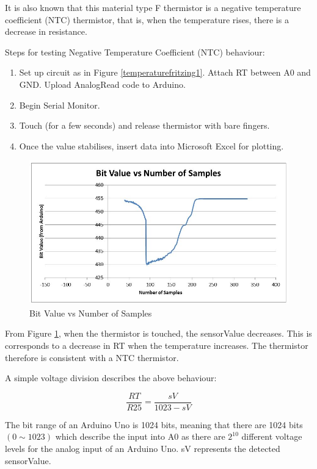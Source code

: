 It is also known that this material type F thermistor is a negative temperature coefficient (NTC) thermistor, that is, when the temperature rises, there is a decrease in resistance. 

Steps for testing Negative Temperature Coefficient (NTC) behaviour: 
\begin{enumerate}
	\item Set up circuit as in Figure \ref{temperaturefritzing1}. Attach RT between A0 and GND. Upload AnalogRead code to Arduino. 
	\item Begin Serial Monitor.
	\item Touch (for a few seconds) and release thermistor with bare fingers. 
	\item Once the value stabilises, insert data into Microsoft Excel for plotting. 
\end{enumerate}

\begin{figure}[H]
	\centering
	\includegraphics[width=\linewidth]{thermistor1.jpg}
	\caption{Bit Value vs Number of Samples}
	\label{bitvaluevssamples}
\end{figure}

From Figure \ref{bitvaluevssamples}, when the thermistor is touched, the sensorValue decreases. This is corresponds to a decrease in RT when the temperature increases. The thermistor therefore is consistent with a NTC thermistor. 

A simple voltage division describes the above behaviour: 

\begin{equation}
	\frac{RT}{R25}=\frac{sV}{1023-sV}
	\label{thermistorresistance3}
\end{equation}

The bit range of an Arduino Uno is 1024 bits, meaning that there are 1024 bits $(0\sim 1023)$ which describe the input into A0 as there are $2^{10}$ different voltage levels for the analog input of an Arduino Uno. sV represents the detected sensorValue. 


